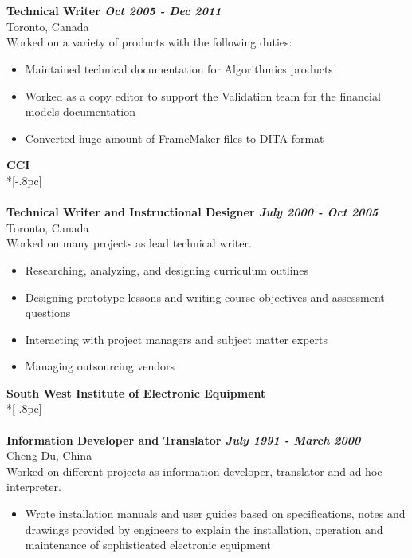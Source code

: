 \documentclass[11pt]{extarticle}
\begin{document}
\begin{itemize}
\underline{\hspace{6.55in}} \\
\\
{\bf Technical Writer \hfill \it Oct 2005 - Dec 2011\/} \\
Toronto, Canada\\
Worked on a variety of products with the following duties:
\begin{itemize}
\setlength{\itemsep}{0pt}
  \item Maintained technical documentation for Algorithmics products
  \item Worked as a copy editor to support the Validation team for the financial models documentation
  \item Converted huge amount of FrameMaker files to DITA format \\
\end{itemize}
{\large \bf CCI } \\*[-.8pc]
\underline{\hspace{6.55in}} \\
\\
{\bf Technical Writer and Instructional Designer \hfill \it July 2000 - Oct 2005} \\
Toronto, Canada \\
 Worked on many projects as lead technical writer.
\begin {itemize}
\setlength{\itemsep}{0pt}
\item Researching, analyzing, and designing curriculum outlines
\item Designing prototype lessons and writing course objectives and assessment questions
\item Interacting with project managers and subject matter experts
\item Managing outsourcing vendors \\
\end{itemize}
{\large \bf South West Institute of Electronic Equipment } \\*[-.8pc]
\underline{\hspace{6.55in}} \\
\\
{\bf Information Developer and Translator \hfill \it July 1991 - March 2000\/} \\
Cheng Du, China \\
 Worked on different projects as information developer, translator and ad hoc interpreter. 
\begin {itemize}
\setlength{\itemsep}{0pt}
\item Wrote installation manuals and user guides based on specifications, notes and drawings provided by engineers to explain the installation, operation and maintenance of sophisticated electronic equipment 

\end{itemize}
\end{itemize}
\end{document}
